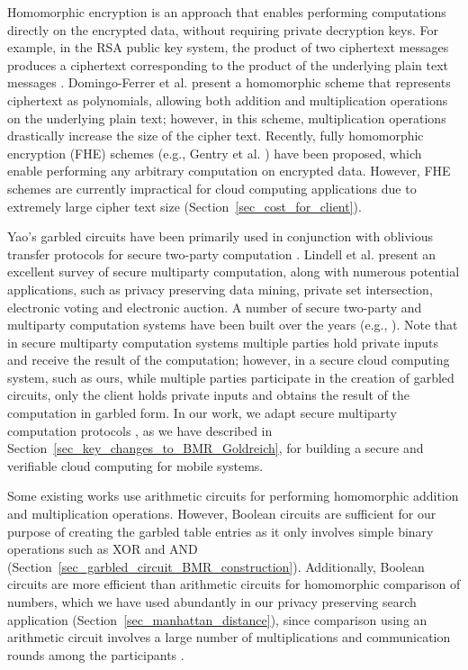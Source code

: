 \documentclass[10pt,journal,cspaper,compsoc]{IEEEtran}
\begin{document}
Homomorphic encryption is an approach that enables performing computations directly on the encrypted data, without requiring private decryption keys. For example, in the RSA public key system, the product of two ciphertext messages produces a ciphertext corresponding to the product of the underlying plain text messages \cite{rivest78}. Domingo-Ferrer et al. \cite{domingoFerrer02} present a homomorphic scheme that represents ciphertext as polynomials, allowing both addition and multiplication operations on the underlying plain text; however, in this scheme, multiplication operations drastically increase the size of the cipher text. Recently, fully homomorphic encryption (FHE) schemes (e.g., Gentry et al. \cite{gentry10}) have been proposed, which enable performing any arbitrary computation on encrypted data. However, FHE schemes are currently impractical for cloud computing applications due to extremely large cipher text size (Section~\ref{sec_cost_for_client}).


Yao's garbled circuits have been primarily used in conjunction with oblivious transfer protocols for secure two-party computation \cite{yao82,yao86,lindell09}. Lindell et al. \cite{lindell_survey09} present an excellent survey of secure multiparty computation, along with numerous potential applications, such as privacy preserving data mining, private set intersection, electronic voting and electronic auction. A number of secure two-party and multiparty computation systems have been built over the years (e.g., \cite{henecka10,malkhi04,david08}). Note that in secure multiparty computation systems multiple parties hold private inputs and receive the result of the computation; however, in a secure cloud computing system, such as ours, while multiple parties participate in the creation of garbled circuits, only the client holds private inputs and obtains the result of the computation in garbled form. In our work, we adapt secure multiparty computation protocols \cite{goldreich04,goldreich87,beaver90,rogaway91}, as we have described in Section~\ref{sec_key_changes_to_BMR_Goldreich}, for building a secure and verifiable cloud computing for mobile systems.


Some existing works \cite{burkhart10,damgaard12} use arithmetic circuits for performing homomorphic addition and multiplication operations. However, Boolean circuits are sufficient for our purpose of creating the garbled table entries as it only involves simple binary operations such as XOR and AND (Section~\ref{sec_garbled_circuit_BMR_construction}). Additionally, Boolean circuits are more efficient than arithmetic circuits for homomorphic comparison of numbers, which we have used abundantly in our privacy preserving search application (Section~\ref{sec_manhattan_distance}), since comparison using an arithmetic circuit involves a large number of multiplications and communication rounds among the participants \cite{burkhart10,damgaard12}.
\end{document}
